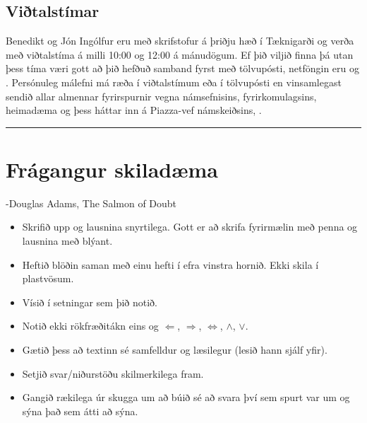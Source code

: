 \documentclass[a4paper,10pt,icelandic]{sphinxmanual}
\begin{document}
\subsection{Viðtalstímar}
\label{\detokenize{vidauki:vitalstimar}}
Benedikt og Jón Ingólfur eru með skrifstofur á þriðju hæð í Tæknigarði
og verða með viðtalstíma á milli 10:00 og 12:00 á
mánudögum. Ef þið viljið finna þá utan þess tíma væri gott að þið
hefðuð samband fyrst með tölvupósti, netföngin eru 
og . Persónuleg málefni má ræða í viðtalstímum eða í
tölvupósti en vinsamlegast sendið allar almennar fyrirspurnir vegna
námsefnisins, fyrirkomulagsins, heimadæma og þess háttar inn á Piazza-vef
námskeiðsins, .


\bigskip\hrule\bigskip


\newpage


\section{Frágangur skiladæma}
\label{\detokenize{vidauki:fragangur-skiladaema}}\label{\detokenize{vidauki:fragangurskiladaema}}

-Douglas Adams, The Salmon of Doubt
\begin{itemize}
\item {} 
Skrifið upp  og lausnina snyrtilega. Gott er að skrifa fyrirmælin
með penna og lausnina með blýant.

\item {} 
Heftið blöðin saman með einu hefti í efra vinstra hornið. Ekki skila í plastvösum.

\item {} 
Vísið í setningar sem þið notið.

\item {} 
Notið ekki rökfræðitákn eins og \(\Leftarrow\),
\(\Rightarrow\), \(\Leftrightarrow\), \(\wedge\),
\(\vee\).

\item {} 
Gætið þess að textinn sé samfelldur og læsilegur (lesið hann sjálf yfir).

\item {} 
Setjið svar/niðurstöðu skilmerkilega fram.

\item {} 
Gangið rækilega úr skugga um að búið sé að svara því sem spurt var um og sýna það sem átti að sýna.

\end{itemize}
\end{document}
